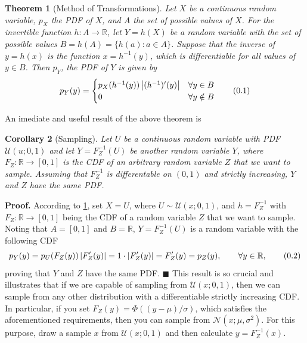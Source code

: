 \documentclass[10pt]{article}
\newtheorem{thm}{Theorem}[section]
\newtheorem{cor}[thm]{Corollary}
\theoremstyle{definition}
\newenvironment{prf}{\noindent\textbf{Proof.}}{\hfill$\blacksquare$}
\newcommand\eqnum{\addtocounter{equation}{1}\tag{\arabic{section}.\arabic{equation}}}
\begin{document}
\begin{thm}[Method of Transformations]\label{thm:MT}
Let $X$ be a continuous random variable, $p_X$ the PDF of $X$, and $A$ the set of possible values of $X$. For the invertible function $h:A\to\mathbb{R}$, let $Y=h(X)$ be a random variable with the set of possible values $B=h(A)=\{h(a): a\in A\}$. Suppose that the inverse of $y=h(x)$ is the function $x=h^{-1}(y)$, which is differentiable for all values of $y\in B$. Then $p_Y$, the PDF of $Y$ is given by
\begin{equation*}
p_Y(y) = 
\begin{cases}
p_X(h^{-1}(y))\left|(h^{-1})'(y)\right| & \forall y \in B  \\
0 & \forall y \notin B 
\end{cases}
\eqnum
\end{equation*}
\end{thm}
\noindent
An imediate and useful result of the above theorem is
\begin{cor}[Sampling]\label{thm:sample}
Let $U$ be a continuous random variable with PDF $\mathcal{U}(u; 0, 1)$ and let $Y=F_Z^{-1}(U)$ be another random variable $Y$, where $F_Z:\mathbb{R}\to[0,1]$ is the CDF of an arbitrary random variable $Z$ that we want to sample. Assuming that $F_Z^{-1}$ is differentable on $(0, 1)$ and strictly increasing, $Y$ and $Z$ have the same PDF.
\end{cor}
\begin{prf}
According to \cref{thm:MT}, set $X=U$, where $U\sim\mathcal{U}(x; 0, 1)$, and $h = F_Z^{-1}$ with $F_Z:\mathbb{R} \to [0, 1]$ being the CDF of a random variable $Z$ that we want to sample. Noting that $A=[0, 1]$ and $B=\mathbb{R}$,  $Y=F_Z^{-1}(U)$ is a random variable with the following CDF
\begin{equation*}
p_Y(y) = p_U(F_Z(y))\left|F_Z'(y)\right|=1\cdot\left|F_Z'(y)\right|= F_Z'(y)=p_Z(y),  \qquad \forall y \in \mathbb{R},
\eqnum
\end{equation*}
proving that $Y$ and $Z$ have the same PDF.
\end{prf}
\newline
This result is so crucial and illustrates that if we are capable of sampling from $\mathcal{U}(x; 0, 1)$, then we can sample from any other distribution with a differentiable strictly increasing CDF. In particular, if you set $F_Z(y) = \Phi((y-\mu)/\sigma)$, which satisfies the aforementioned requirements, then you can sample from $\mathcal{N}(x; \mu, \sigma^2)$. For this purpose, draw a sample $x$ from $\mathcal{U}(x; 0, 1)$ and then calculate $y=F_Z^{-1}(x)$.
\end{document}
